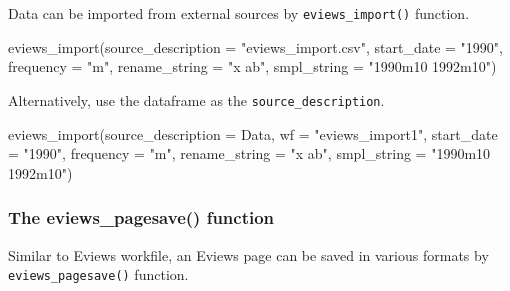 \documentclass[
  letterpaper,
  DIV=11,
  numbers=noendperiod]{scrartcl}
\newenvironment{Shaded}{\begin{snugshade}}{\end{snugshade}}
\newcommand{\AttributeTok}[1]{\textcolor[rgb]{0.40,0.45,0.13}{#1}}
\newcommand{\FunctionTok}[1]{\textcolor[rgb]{0.28,0.35,0.67}{#1}}
\newcommand{\NormalTok}[1]{\textcolor[rgb]{0.00,0.23,0.31}{#1}}
\newcommand{\StringTok}[1]{\textcolor[rgb]{0.13,0.47,0.30}{#1}}
\begin{document}
Data can be imported from external sources by \texttt{eviews\_import()}
function.

\begin{figure}

\end{figure}

\begin{Shaded}
\begin{Highlighting}[]
\FunctionTok{eviews\_import}\NormalTok{(}\AttributeTok{source\_description =} \StringTok{"eviews\_import.csv"}\NormalTok{, }\AttributeTok{start\_date =} \StringTok{"1990"}\NormalTok{,}
    \AttributeTok{frequency =} \StringTok{"m"}\NormalTok{, }\AttributeTok{rename\_string =} \StringTok{"x ab"}\NormalTok{, }\AttributeTok{smpl\_string =} \StringTok{"1990m10 1992m10"}\NormalTok{)}
\end{Highlighting}
\end{Shaded}

\begin{figure}

\end{figure}

Alternatively, use the dataframe as the \texttt{source\_description}.

\begin{Shaded}
\begin{Highlighting}[]
\FunctionTok{eviews\_import}\NormalTok{(}\AttributeTok{source\_description =}\NormalTok{ Data, }\AttributeTok{wf =} \StringTok{"eviews\_import1"}\NormalTok{,}
    \AttributeTok{start\_date =} \StringTok{"1990"}\NormalTok{, }\AttributeTok{frequency =} \StringTok{"m"}\NormalTok{, }\AttributeTok{rename\_string =} \StringTok{"x ab"}\NormalTok{,}
    \AttributeTok{smpl\_string =} \StringTok{"1990m10 1992m10"}\NormalTok{)}
\end{Highlighting}
\end{Shaded}

\begin{figure}

\end{figure}

\hypertarget{the-eviews_pagesave-function}{%
\subsubsection{The eviews\_pagesave()
function}\label{the-eviews_pagesave-function}}

Similar to Eviews workfile, an Eviews page can be saved in various
formats by \texttt{eviews\_pagesave()} function.
\end{document}
